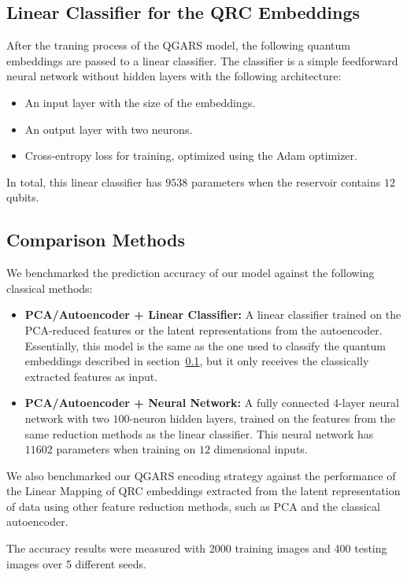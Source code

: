 \documentclass[conference]{IEEEtran}
\begin{document}
\subsection{Linear Classifier for the QRC Embeddings} \label{linear_classifier_for_the_qrc_embeddings}
After the traning process of the QGARS model,
the following quantum embeddings are passed to a linear classifier.
The classifier is a simple feedforward neural network without hidden layers with the following architecture:
\begin{itemize}
    \item An input layer with the size of the embeddings.
    \item An output layer with two neurons.
    \item Cross-entropy loss for training, optimized using the Adam optimizer.
\end{itemize}
In total, this linear classifier has \(9538\) parameters when the reservoir contains $12$ qubits.

\subsection{Comparison Methods}
We benchmarked the prediction accuracy of our model against the following classical methods:
\begin{itemize}
    \item \textbf{PCA/Autoencoder + Linear Classifier:} 
    A linear classifier trained on the PCA-reduced features or the latent representations from the autoencoder. Essentially, this model is the same as the one used to classify the quantum embeddings described in section~\ref{linear_classifier_for_the_qrc_embeddings}, but it only receives the classically extracted features as input. 
    
    \item \textbf{PCA/Autoencoder + Neural Network:}
    A fully connected 4-layer neural network with two $100$-neuron hidden layers, trained on the features from the same reduction methods as the linear classifier. This neural network has $11602$ parameters when training on $12$ dimensional inputs.
\end{itemize}

We also benchmarked our QGARS encoding strategy
against the performance of the Linear Mapping of
QRC embeddings extracted from the latent representation 
of data using other feature reduction methods, such as
PCA and the classical autoencoder.

The accuracy results were measured with 2000 training images and 400 testing images over 5 different seeds. 
\end{document}
